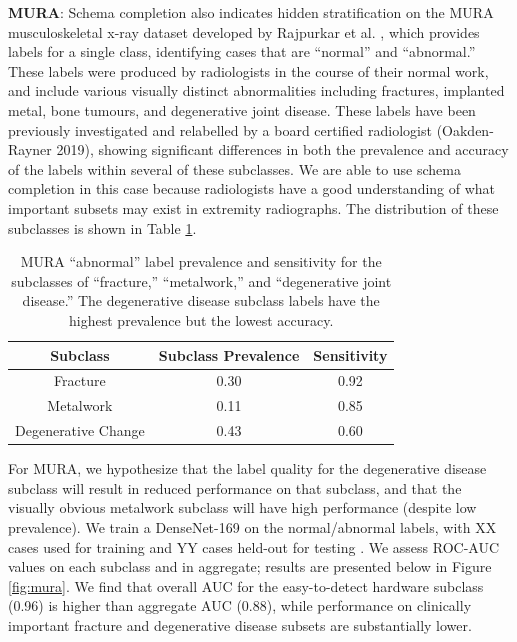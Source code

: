 \documentclass{article}
\begin{document}
\textbf{MURA}: Schema completion also indicates hidden stratification on the MURA musculoskeletal x-ray dataset developed by Rajpurkar et al. \citep{Rajpurkar2017-rc}, which provides labels for a single class, identifying cases that are ``normal'' and ``abnormal.'' 
These labels were produced by radiologists in the course of their normal work, and include various visually distinct abnormalities including fractures, implanted metal, bone tumours, and degenerative joint disease. 
These labels have been previously investigated and relabelled by a board certified radiologist (Oakden-Rayner 2019), showing significant differences in both the prevalence and accuracy of the labels within several of these subclasses. 
We are able to use schema completion in this case because radiologists have a good understanding of what important subsets may exist in extremity radiographs.
The distribution of these subclasses is shown in Table \ref{tab:mura2}.

\begin{table}[]
\centering
\begin{tabular}{|c|c|c|}
 \hline
 Subclass & Subclass Prevalence & Sensitivity \\
 \hline
 Fracture & 0.30 & 0.92   \\
 Metalwork & 0.11 & 0.85    \\
 Degenerative Change & 0.43 & 0.60 \\
 \hline
\end{tabular}
\caption{MURA ``abnormal'' label prevalence and sensitivity for the subclasses of ``fracture,'' ``metalwork,'' and ``degenerative joint disease.'' The degenerative disease subclass labels have the highest prevalence but the lowest accuracy.}
\label{tab:mura2}
\vspace{-6mm}
\end{table}

For MURA, we hypothesize that the label quality for the degenerative disease subclass will result in reduced performance on that subclass, and that the visually obvious metalwork subclass will have high performance (despite low prevalence).
 We train a DenseNet-169 on the normal/abnormal labels, with XX cases used for training and YY cases held-out for testing \citep{Rajpurkar2017-rc}.  
 We assess ROC-AUC values on each subclass and in aggregate; results are presented below in Figure \ref{fig:mura}.  
 We find that overall AUC for the easy-to-detect hardware subclass (0.96) is higher than aggregate AUC (0.88), while performance on clinically important fracture and degenerative  disease subsets are substantially lower.  
\end{document}
